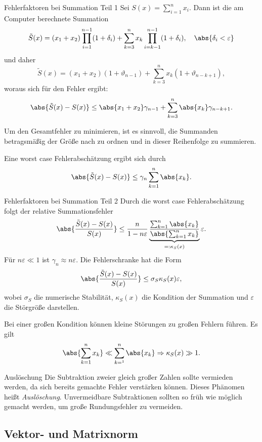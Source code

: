 \begin{karte}{Fehlerfaktoren bei Summation Teil 1}
    Sei \( S(x) = \sum_{i=1}^n x_i \). Dann ist die am Computer berechnete Summation 
    \[ \tilde{S}(x) = (x_1 + x_2) \prod_{i=1}^{n-1} (1+\delta_i) + \sum_{k=3}^n x_k \prod_{i=k-1}^{n-1} (1+\delta_i), \quad \abs{\delta_i < \varepsilon} \]
    und daher 
    \[ \tilde{S}(x) = (x_1 + x_2)(1 + \vartheta_{n-1}) + \sum_{k=3}^n x_k(1 + \vartheta_{n-k+1}), \]
    woraus sich für den Fehler ergibt:
    \[ \abs{ \tilde{S}(x) - S(x) } \leq \abs{x_1 + x_2}\gamma_{n-1} + \sum_{k=3}^n \abs{x_k}\gamma_{n-k+1}. \]

    Um den Gesamtfehler zu minimieren, ist es sinnvoll, die Summanden betragsmäßig der Größe 
    nach zu ordnen und in dieser Reihenfolge zu summieren.
    
    Eine worst case Fehlerabschätzung ergibt sich durch 
    \[ \abs{ \tilde{S}(x) - S(x) } \leq \gamma_n \sum_{k=1}^n \abs{x_k}. \]
\end{karte}

\begin{karte}{Fehlerfaktoren bei Summation Teil 2}
    Durch die worst case Fehlerabschätzung folgt der relative Summationsfehler 
    \[ \abs{ \frac{ \tilde{S}(x) - S(x) }{ S(x) } } \leq \frac{n}{1 - n\varepsilon} \underbrace{ \frac{ \sum_{k=1}^n \abs{x_k} }{ \abs{ \sum_{k=1}^n x_k } } }_{=: \kappa_S(x)} \varepsilon. \]
    Für \( n\varepsilon \ll 1 \) ist \( \gamma_n \approx n\varepsilon \). 
    Die Fehlerschranke hat die Form 
    \[ \abs{ \frac{ \tilde{S}(x) - S(x) }{ S(x) } } \leq \sigma_S \kappa_S(x) \varepsilon, \]
    wobei \( \sigma_S \) die numerische Stabilität, \( \kappa_S(x) \) die Kondition 
    der Summation und \( \varepsilon \) die Störgröße darstellen.

    Bei einer großen Kondition können kleine Störungen zu großen Fehlern führen. 
    Es gilt 
    \[ \abs{ \sum_{k=1}^n x_k } \ll \sum_{k=^1}^n \abs{x_k} \Rightarrow \kappa_S(x) \gg 1. \]
\end{karte}

\begin{karte}{Auslöschung}
    Die Subtraktion zweier gleich großer Zahlen sollte vermieden werden, 
    da sich bereits gemachte Fehler verstärken können. Dieses Phänomen heißt \textit{Auslöschung}.
    Unvermeidbare Subtraktionen sollten so früh wie möglich gemacht werden, um große Rundungsfehler 
    zu vermeiden.
\end{karte}

\subsection*{Vektor- und Matrixnorm}


